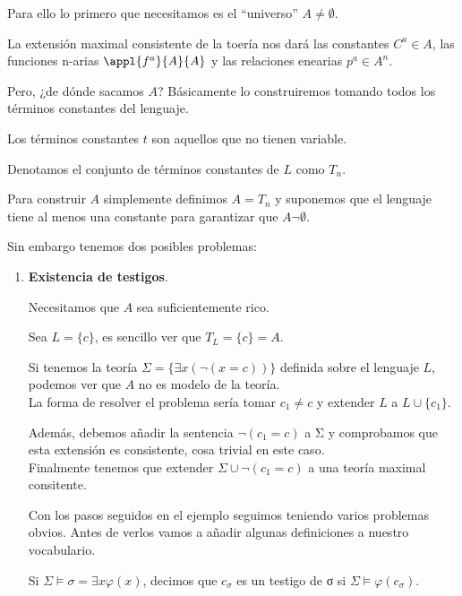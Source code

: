\begin{enumerate}
Para ello lo primero que necesitamos es el ``universo'' $A \neq \emptyset$.

La extensión maximal consistente de la toería nos dará las constantes $C^a \in A$, las funciones n-arias $\appl{f^a}{A}{A}$ y las relaciones enearias $p^a \in A^n$.

Pero, ¿de dónde sacamos $A$? Básicamente lo construiremos tomando todos los términos constantes del lenguaje.

\begin{defn}
Los términos constantes $t$ son aquellos que no tienen variable.

Denotamos el conjunto de términos constantes de $L$ como $T_n$.
\end{defn}

Para construir $A$ simplemente definimos $A=T_n$ y suponemos que el lenguaje tiene al menos una constante para garantizar que $A\neg \emptyset$.

Sin embargo tenemos dos posibles problemas:
\begin{enumerate}
\item \textbf{Existencia de testigos}.

Necesitamos que $A$ sea suficientemente rico.

\begin{example}
Sea $L=\{c\}$, es sencillo ver que $T_L=\{c\}=A$.

Si tenemos la teoría $Σ = \{\exists x(\neg (x=c))\}$ definida sobre el lenguaje $L$, podemos ver que $A$ no es modelo de la teoría.\\

La forma de resolver el problema sería tomar $c_1\neq c$ y extender $L$ a $L \cup \{c_1\}$.

Además, debemos añadir la sentencia $\neg (c_1 = c)$ a Σ y comprobamos que esta extensión es consistente, cosa trivial en este caso.\\

Finalmente tenemos que extender $Σ\cup \neg(c_1=c)$ a una teoría maximal consitente.
\end{example}

Con los pasos seguidos en el ejemplo seguimos teniendo varios problemas obvios. Antes de verlos vamos a añadir algunas definiciones a nuestro vocabulario.

\begin{defn}[Testigo de σ]
Si $Σ\models σ = \exists x \varphi(x)$, decimos que $c_σ$ es un testigo de σ si $Σ \models \varphi(c_σ)$.
\end{defn}


\end{enumerate}
\end{enumerate}

